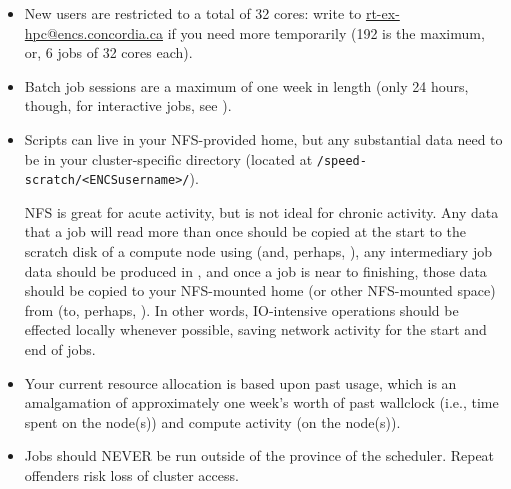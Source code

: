 \begin{itemize}
    \item
    New users are restricted to a total of 32 cores: write to \url{rt-ex-hpc@encs.concordia.ca}
    if you need more temporarily (192 is the maximum, or, 6 jobs of 32 cores each).
    
    \item
    Batch job sessions are a maximum of one week in length (only 24 hours, though,
    for interactive jobs, see ).
    
    \item
    Scripts can live in your NFS-provided home, but any substantial data need
    to be in your cluster-specific directory
    (located at \verb+/speed-scratch/<ENCSusername>/+).
    
    NFS is great for acute activity, but is not ideal for chronic activity.
    Any data that a job will 
    read more than once should be copied at the start to the scratch disk of a 
    compute node using  (and, perhaps, ), 
    any intermediary job data should be produced in , and once a 
    job is near to finishing, those data should be copied to your NFS-mounted 
    home (or other NFS-mounted space) from  (to, perhaps,
    ). In other words, IO-intensive operations should be effected 
    locally whenever possible, saving network activity for the start and end of 
    jobs. 
    
    \item
    Your current resource allocation is based upon past usage, which is an 
    amalgamation of approximately one week's worth of past wallclock (i.e., time 
    spent on the node(s)) and compute activity (on the node(s)).
    
    \item
    Jobs should NEVER be run outside of the province of the scheduler.
    Repeat offenders risk loss of cluster access. 
    
\end{itemize}